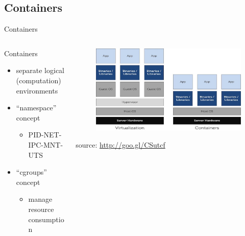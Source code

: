 \subsection{Containers}
\begin{frame}{Containers}
	\begin{columns}
		\begin{column}{0.5\textwidth}
			Containers
			\begin{itemize}
				\item{\footnotesize{separate logical (computation) environments}}
				\item{\footnotesize{``namespace'' concept}}
				\begin{itemize}
					\item{\scriptsize{PID-NET-IPC-MNT-UTS}}
				\end{itemize}
				\item{\footnotesize{``cgroups'' concept}}
				\begin{itemize}
					\item{\scriptsize{manage resource consumption}}
				\end{itemize}
			\end{itemize}
		\end{column}
		\begin{column}{0.5\textwidth}
			\begin{figure}
				\centering{}
				\includegraphics[scale=0.6]{images/containerization.png}
			\end{figure}
			\begin{flushright}
				\tiny{source: \url{http://goo.gl/CSutcf}}
			\end{flushright}
		\end{column}
	\end{columns}
\end{frame}

